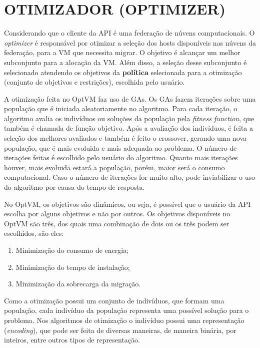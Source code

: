 \section{OTIMIZADOR (OPTIMIZER)}

Considerando que o cliente da API é uma federação de núvens computacionais.
O \textit{optimizer} é responsável por otimizar a seleção dos hosts disponíveis nas núvens da federação,
para a VM que necessita migrar. O objetivo é alcançar um melhor subconjunto para a alocação da VM. 
Além disso, a seleção desse subconjunto é selecionado atendendo os objetivos da \textbf{política} 
selecionada para a otimização (conjunto de objetivos e restrições), escolhida pelo usuário.

A otimização feita no OptVM faz uso de GAs. Os GAs fazem iterações sobre 
uma população que é iniciada aleatoriamente no algoritmo. Para cada iteração,
o algoritmo avalia os indivíduos ou soluções da população pela \textit{fitness function}, 
que também é chamada de função objetivo. Após a avaliação dos indivíduos, é
feita a seleção dos melhores avaliados e também é feito o crossover, gerando uma nova população,
que é mais evoluida e mais adequada ao problema. O número de iterações
feitas é escolhido pelo usuário do algoritmo. Quanto mais iterações houver, mais evoluida
estará a população, porém, maior será o consumo computacional. Caso o número de iterações
for muito alto, pode inviabilizar o uso do algoritmo por causa do tempo de resposta.

No OptVM, os objetivos são dinâmicos, ou seja, é possível que o usuário da API escolha por alguns
objetivos e não por outros. Os objetivos disponíveis no OptVM são três, dos quais uma combinação de
dois ou os três podem ser escolhidos, são eles:

\begin{enumerate}
\item Minimização do consumo de energia;
\item Minimização do tempo de instalação;
\item Minimização da sobrecarga da migração.
\end{enumerate}

Como a otimização possui um conjunto de indivíduos, que formam uma população, cada indivíduo
da população representa uma possível solução para o problema.  Nos algoritmos de 
otimização o indivíduo possui uma representação (\textit{encoding}), que pode ser feita
de diversas maneiras, de maneira binária, por inteiros, entre outros tipos de representação.

